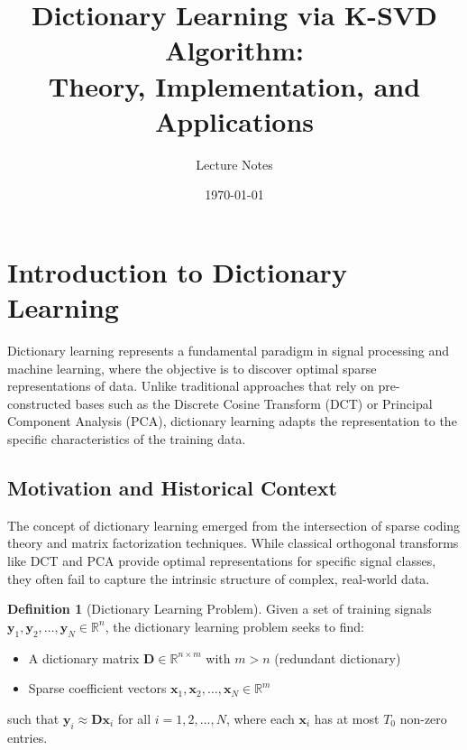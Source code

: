 \documentclass[12pt]{article}
\title{Dictionary Learning via K-SVD Algorithm: \\ Theory, Implementation, and Applications}
\author{Lecture Notes}
\date{\today}
\renewcommand{\vec}[1]{\mathbf{#1}}
\newcommand{\R}{\mathbb{R}}
\theoremstyle{definition}
\newtheorem{definition}{Definition}[section]
\begin{document}
\maketitle


\tableofcontents
\newpage

\section{Introduction to Dictionary Learning}

Dictionary learning represents a fundamental paradigm in signal processing and machine learning, where the objective is to discover optimal sparse representations of data. Unlike traditional approaches that rely on pre-constructed bases such as the Discrete Cosine Transform (DCT) or Principal Component Analysis (PCA), dictionary learning adapts the representation to the specific characteristics of the training data.

\subsection{Motivation and Historical Context}

The concept of dictionary learning emerged from the intersection of sparse coding theory and matrix factorization techniques. While classical orthogonal transforms like DCT and PCA provide optimal representations for specific signal classes, they often fail to capture the intrinsic structure of complex, real-world data.

\begin{definition}[Dictionary Learning Problem]
    Given a set of training signals $\vec{y}_1, \vec{y}_2, \ldots, \vec{y}_N \in \R^n$, the dictionary learning problem seeks to find:
    \begin{itemize}
        \item A dictionary matrix $\mathbf{D} \in \R^{n \times m}$ with $m > n$ (redundant dictionary)
        \item Sparse coefficient vectors $\vec{x}_1, \vec{x}_2, \ldots, \vec{x}_N \in \R^m$
    \end{itemize}
    such that $\vec{y}_i \approx \mathbf{D}\vec{x}_i$ for all $i = 1, 2, \ldots, N$, where each $\vec{x}_i$ has at most $T_0$ non-zero entries.
\end{definition}
\end{document}
